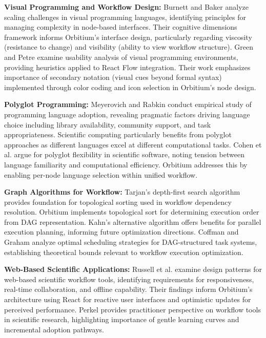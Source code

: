 \documentclass[12pt]{article}
\begin{document}
\hspace{\parindent}\textbf{Visual Programming and Workflow Design:} Burnett and Baker \cite{burnett2016scaling} analyze scaling challenges in visual programming languages, identifying principles for managing complexity in node-based interfaces. Their cognitive dimensions framework informs Orbitium's interface design, particularly regarding viscosity (resistance to change) and visibility (ability to view workflow structure). Green and Petre \cite{green1996usability} examine usability analysis of visual programming environments, providing heuristics applied to React Flow integration. Their work emphasizes importance of secondary notation (visual cues beyond formal syntax) implemented through color coding and icon selection in Orbitium's node design.

\hspace{\parindent}\textbf{Polyglot Programming:} Meyerovich and Rabkin \cite{meyerovich2013empirical} conduct empirical study of programming language adoption, revealing pragmatic factors driving language choice including library availability, community support, and task appropriateness. Scientific computing particularly benefits from polyglot approaches as different languages excel at different computational tasks. Cohen et al. \cite{cohen2020scientific} argue for polyglot flexibility in scientific software, noting tension between language familiarity and computational efficiency. Orbitium addresses this by enabling per-node language selection within unified workflow.

\hspace{\parindent}\textbf{Graph Algorithms for Workflow:} Tarjan's \cite{tarjan1972depth} depth-first search algorithm provides foundation for topological sorting used in workflow dependency resolution. Orbitium implements topological sort for determining execution order from DAG representation. Kahn's \cite{kahn1962topological} alternative algorithm offers benefits for parallel execution planning, informing future optimization directions. Coffman and Graham \cite{coffman1972optimal} analyze optimal scheduling strategies for DAG-structured task systems, establishing theoretical bounds relevant to workflow execution optimization.

\hspace{\parindent}\textbf{Web-Based Scientific Applications:} Russell et al. \cite{russell2018workflow} examine design patterns for web-based scientific workflow tools, identifying requirements for responsiveness, real-time collaboration, and offline capability. Their findings inform Orbitium's architecture using React for reactive user interfaces and optimistic updates for perceived performance. Perkel \cite{perkel2019workflow} provides practitioner perspective on workflow tools in scientific research, highlighting importance of gentle learning curves and incremental adoption pathways.
\end{document}
